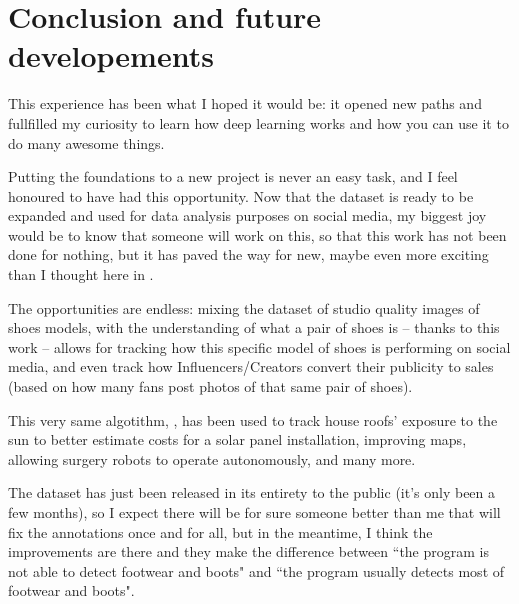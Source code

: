 \chapter{Conclusion and future developements}\label{s:conclusion}

This experience has been what I hoped it would be: it opened new paths and fullfilled my curiosity to learn how deep learning works and how you can use it to do many awesome things.

Putting the foundations to a new project is never an easy task, and I feel honoured to have had this opportunity. Now that the dataset is ready to be expanded and used for data analysis purposes on social media, my biggest joy would be to know that someone will work on this, so that this work has not been done for nothing, but it has paved the way for new, maybe even more exciting than I thought here in .

The opportunities are endless: mixing the dataset of studio quality images of shoes models, with the understanding of what a pair of shoes is -- thanks to this work -- allows for tracking how this specific model of shoes is performing on social media, and even track how Influencers/Creators convert their publicity to sales (based on how many fans post photos of that same pair of shoes).

This very same algotithm, \maskrcnn, has been used to track house roofs' exposure to the sun to better estimate costs for a solar panel installation, improving maps, allowing surgery robots to operate autonomously, and many more.

The \modanet dataset has just been released in its  entirety to the public (it's only been a few months), so I expect there will be for sure someone better than me that will fix the annotations once and for all, but in the meantime, I think the improvements are there and they make the difference between “the program is not able to detect footwear and boots" and “the program usually detects most of footwear and boots".


